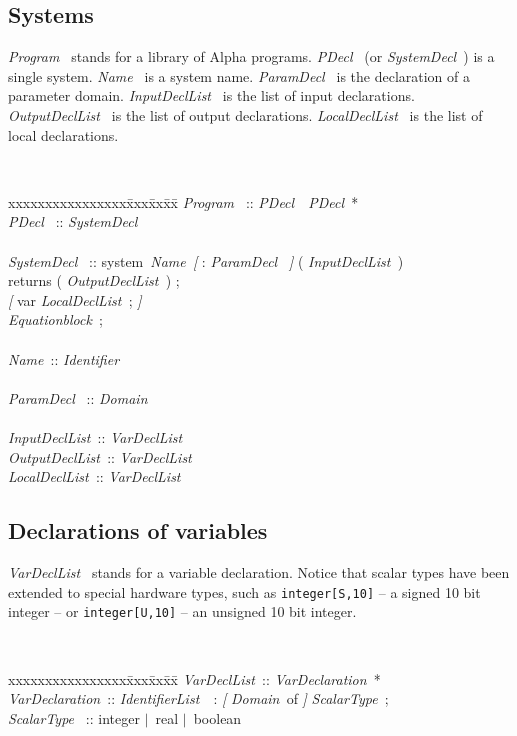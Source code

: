 \documentclass[12pt]{article}
\newcommand{\Alpha}{{\sc Alpha}}
\newcommand{\alfa}{\Alpha}
\newcommand{\Opt}[1]{{\rm\sl [} #1 {\rm\sl ]}}
\newcommand{\Alt}{$\mid$}
\newcommand{\Program}{{\sl Program\ }}
\newcommand{\PDecl}{{\sl PDecl\ }}
\newcommand{\SystemDecl}{{\sl SystemDecl\ }}
\newcommand{\Name}{{\sl Name\ }}
\newcommand{\InputDeclList}{{\sl InputDeclList\ }}
\newcommand{\OutputDeclList}{{\sl OutputDeclList\ }}
\newcommand{\LocalDeclList}{{\sl LocalDeclList\ }}
\newcommand{\VarDeclList}{{\sl VarDeclList\ }}
\newcommand{\EquationBlock}{{\sl Equationblock\ }}
\newcommand{\ParamDecl}{{\sl ParamDecl\ }}
\newcommand{\VarDeclaration}{{\sl VarDeclaration\ }}
\newcommand{\Domain}{{\sl Domain\ }}
\newcommand{\IdentifierList}{{\sl IdentifierList\ }}
\newcommand{\Identifier}{{\sl Identifier\ }}
\newcommand{\ScalarType}{{\sl ScalarType\ }}
\begin{document}
\subsection{Systems}
\Program{} stands for a library of \alfa{} programs. 
\PDecl{} (or \SystemDecl) is a single system. 
\Name{} is a system name. \ParamDecl{} is the declaration 
of a parameter domain. 
\InputDeclList{} is the list of input declarations. 
\OutputDeclList{} is the list of output declarations. 
\LocalDeclList{} is the list of local declarations. 
{\tt
\begin{tabbing}
xxxxxxxxxxxxxxxx\= xxx\= xx\=  xx\= \kill
\Program     \> :: \>\> \PDecl\ \PDecl *\\
\PDecl       \> :: \>\> \SystemDecl\\
\\\SystemDecl   \> :: \>\> system\ \Name \Opt{ : \ParamDecl }
                                    ( \InputDeclList )\\
\> \>\>\>  returns ( \OutputDeclList ) ;\\
\> \>\>\> \Opt{ var \LocalDeclList ;} \\
\> \>\>\> \EquationBlock ;\\
\\
\Name \>::\>\> \Identifier\\
\\
\ParamDecl  \> :: \>\> \Domain \\
\\
\InputDeclList \>::\>\> \VarDeclList\\
\OutputDeclList \>::\>\> \VarDeclList\\
\LocalDeclList \>::\>\> \VarDeclList\\
\end{tabbing}
}

\subsection{Declarations of variables}
\VarDeclList{} stands for a variable declaration. 
Notice that scalar types have been extended to 
special hardware types, such as 
\texttt{integer[S,10]} -- a signed
10 bit integer -- or
\texttt{integer[U,10]} -- an unsigned
10 bit integer. 
{\tt
\begin{tabbing}
xxxxxxxxxxxxxxxx\= xxx\= xx\=  xx\= \kill
\VarDeclList \>::\>\> \VarDeclaration *\\
\VarDeclaration \>::\>\> \IdentifierList\ : \Opt{\Domain of} \ScalarType ;\\
\ScalarType \> ::\>\> integer \Alt\ real \Alt\ boolean
\end{tabbing}
}
\end{document}
